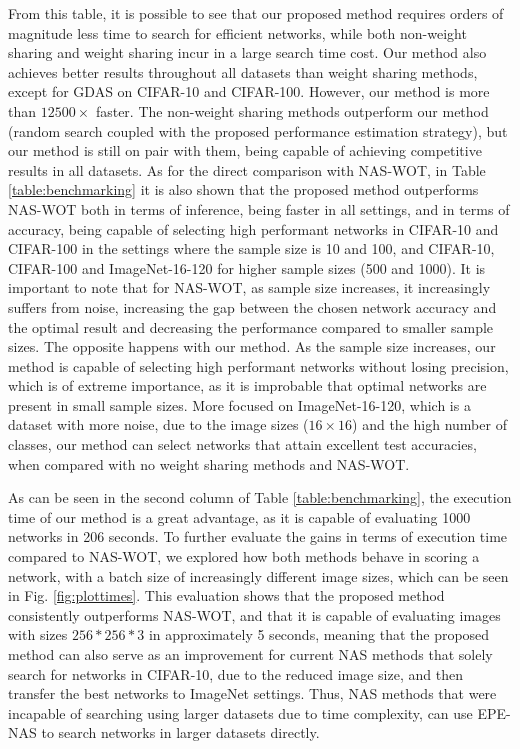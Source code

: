 \documentclass[10pt, conference]{IEEEtran}
\begin{document}
From this table, it is possible to see that our proposed method requires orders of magnitude less time to search for efficient networks, while both non-weight sharing and weight sharing incur in a large search time cost. Our method also achieves better results throughout all datasets than weight sharing methods, except for GDAS on CIFAR-10 and CIFAR-100. However, our method is more than $12500\times$ faster. The non-weight sharing methods outperform our method (random search coupled with the proposed performance estimation strategy), but our method is still on pair with them, being capable of achieving competitive results in all datasets. As for the direct comparison with NAS-WOT, in Table \ref{table:benchmarking} it is also shown that the proposed method outperforms NAS-WOT both in terms of inference, being faster in all settings, and in terms of accuracy, being capable of selecting high performant networks in CIFAR-10 and CIFAR-100 in the settings where the sample size is 10 and 100, and CIFAR-10, CIFAR-100 and ImageNet-16-120 for higher sample sizes (500 and 1000). It is important to note that for NAS-WOT, as sample size increases, it increasingly suffers from noise, increasing the gap between the chosen network accuracy and the optimal result and decreasing the performance compared to smaller sample sizes. The opposite happens with our method. As the sample size increases, our method is capable of selecting high performant networks without losing precision, which is of extreme importance, as it is improbable that optimal networks are present in small sample sizes. More focused on ImageNet-16-120, which is a dataset with more noise, due to the image sizes ($16\times16$) and the high number of classes, our method can select networks that attain excellent test accuracies, when compared with no weight sharing methods and NAS-WOT.


As can be seen in the second column of Table \ref{table:benchmarking}, the execution time of our method is a great advantage, as it is capable of evaluating 1000 networks in 206 seconds. To further evaluate the gains in terms of execution time compared to NAS-WOT, we explored how both methods behave in scoring a network, with a batch size of increasingly different image sizes, which can be seen in Fig. \ref{fig:plottimes}. This evaluation shows that the proposed method consistently outperforms NAS-WOT, and that it is capable of evaluating images with sizes $256*256*3$ in approximately 5 seconds, meaning that the proposed method can also serve as an improvement for current NAS methods that solely search for networks in CIFAR-10, due to the reduced image size, and then transfer the best networks to ImageNet settings. Thus, NAS methods that were incapable of searching using larger datasets due to time complexity, can use EPE-NAS to search networks in larger datasets directly.
\end{document}
